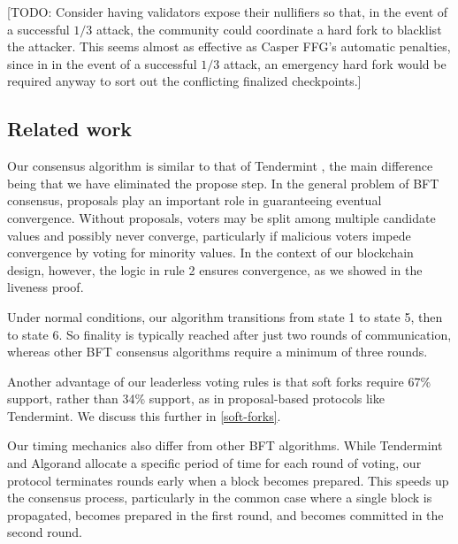 [TODO: Consider having validators expose their nullifiers so that, in the event of a successful $1/3$ attack, the community could coordinate a hard fork to blacklist the attacker. This seems almost as effective as Casper FFG's automatic penalties, since in in the event of a successful $1/3$ attack, an emergency hard fork would be required anyway to sort out the conflicting finalized checkpoints.]


\subsection{Related work}

Our consensus algorithm is similar to that of Tendermint \cite{kwon2014tendermint}, the main difference being that we have eliminated the propose step. In the general problem of BFT consensus, proposals play an important role in guaranteeing eventual convergence. Without proposals, voters may be split among multiple candidate values and possibly never converge, particularly if malicious voters impede convergence by voting for minority values. In the context of our blockchain design, however, the logic in rule 2 ensures convergence, as we showed in the liveness proof.

Under normal conditions, our algorithm transitions from state 1 to state 5, then to state 6. So finality is typically reached after just two rounds of communication, whereas other BFT consensus algorithms require a minimum of three rounds.

Another advantage of our leaderless voting rules is that soft forks require 67\% support, rather than 34\% support, as in proposal-based protocols like Tendermint. We discuss this further in \autoref{soft-forks}.

Our timing mechanics also differ from other BFT algorithms. While Tendermint and Algorand allocate a specific period of time for each round of voting, our protocol terminates rounds early when a block becomes prepared. This speeds up the consensus process, particularly in the common case where a single block is propagated, becomes prepared in the first round, and becomes committed in the second round.
